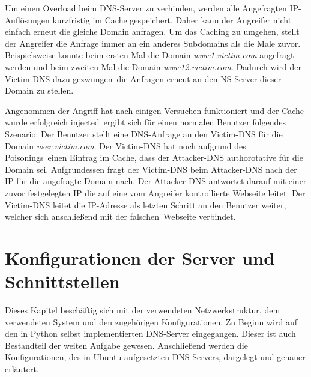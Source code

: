 \documentclass[10pt,a4paper]{article}
\begin{document}
Um einen Overload beim DNS-Server zu verhinden, werden alle Angefragten IP-Auflösungen kurzfristig im Cache gespeichert. Daher kann der Angreifer nicht einfach erneut die gleiche Domain anfragen. Um das Caching zu \glqq umgehen\grqq, stellt der Angreifer die Anfrage immer an ein anderes Subdomains als die Male zuvor. Beispielsweise könnte beim ersten Mal die Domain \emph{www1.victim.com} angefragt werden und beim zweiten Mal die Domain \emph{www12.victim.com}. Dadurch wird der Victim-DNS dazu \glqq gezwungen\grqq\ die Anfragen erneut an den NS-Server dieser Domain zu stellen.

Angenommen der Angriff hat nach einigen Versuchen funktioniert und der Cache wurde erfolgreich \glqq injected\grqq\ ergibt sich für einen normalen Benutzer folgendes Szenario: Der Benutzer stellt eine DNS-Anfrage an den Victim-DNS für die Domain \emph{user.victim.com}. Der Victim-DNS hat noch aufgrund des \glqq Poisonings\grqq\ einen Eintrag im Cache, dass der Attacker-DNS authorotative für die Domain sei. Aufgrundessen fragt der Victim-DNS beim Attacker-DNS nach der IP für die angefragte Domain nach. Der Attacker-DNS antwortet darauf mit einer zuvor festgelegten IP die auf eine vom Angreifer kontrollierte Webseite leitet. Der Victim-DNS leitet die IP-Adresse als letzten Schritt an den Benutzer weiter, welcher sich anschließend mit der \glqq falschen\grqq\ Webseite verbindet.

\section{Konfigurationen der Server und Schnittstellen}
Dieses Kapitel beschäftig sich mit der verwendeten Netzwerkstruktur, dem verwendeten System und den zugehörigen Konfigurationen. Zu Beginn wird auf den in Python selbst implementierten DNS-Server eingegangen. Dieser ist auch Bestandteil der weiten Aufgabe gewesen. Anschließend werden die Konfigurationen, des in Ubuntu aufgesetzten DNS-Servers, dargelegt und genauer erläutert.
\end{document}
